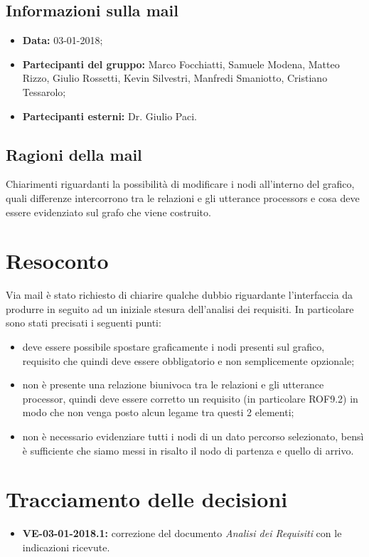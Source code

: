 \documentclass[openany,12pt,a4paper]{article}
\begin{document}
  \subsection{Informazioni sulla mail} 
   
  \begin{itemize}  
      \item \textbf{Data:} 03-01-2018; 
      \item \textbf{Partecipanti del gruppo:} Marco Focchiatti, Samuele Modena, Matteo Rizzo, Giulio Rossetti, Kevin Silvestri, Manfredi Smaniotto, Cristiano Tessarolo; 
      \item \textbf{Partecipanti esterni:} Dr. Giulio Paci. 
  \end{itemize} 
 
  \subsection{Ragioni della mail} 
  Chiarimenti riguardanti la possibilità di modificare i nodi all'interno del grafico, quali differenze intercorrono tra le relazioni e gli utterance processors e cosa deve essere evidenziato sul grafo che viene costruito. 
 
  \section{Resoconto} 
 
  Via mail è stato richiesto di chiarire qualche dubbio riguardante l'interfaccia da produrre in seguito ad un iniziale stesura dell'analisi dei requisiti. 
  In particolare sono stati precisati i seguenti punti: 

   \begin{itemize} 
    \item deve essere possibile spostare graficamente i nodi presenti sul grafico, requisito che quindi deve essere obbligatorio e non semplicemente opzionale; 
    \item non è presente una relazione biunivoca tra le relazioni e gli utterance processor, quindi deve essere corretto un requisito (in particolare ROF9.2) in modo che non venga posto alcun legame tra questi 2 elementi; 
    \item non è necessario evidenziare tutti i nodi di un dato percorso selezionato, bensì è sufficiente che siamo messi in risalto il nodo di partenza e quello di arrivo. 
  \end{itemize} 
 
  \section{Tracciamento delle decisioni} 
   
  \begin{itemize} 
      \item \textbf{VE-03-01-2018.1:}  
      correzione del documento \textit{Analisi dei Requisiti} con le indicazioni ricevute. 
  \end{itemize} 
   
  
\end{document}
